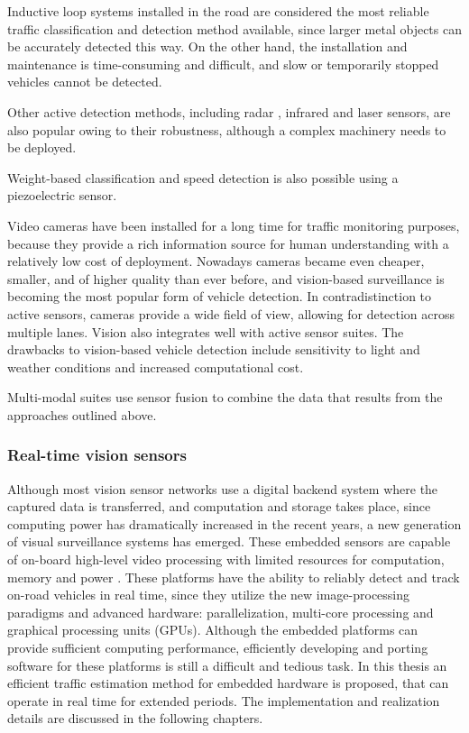 Inductive loop systems installed in the road are considered the most reliable traffic classification and detection method available, since larger metal objects can be accurately detected this way. 
On the other hand, the installation and maintenance is time-consuming and difficult, and slow or temporarily stopped vehicles cannot be detected\cite{Diamond, Zhang2016}.

Other active detection methods, including radar \cite{DeepBlue}, infrared\cite{Swarco, Hussain1995, Ghazal2016} and laser\cite{SICK, Gallego2009} sensors, are also popular owing to their robustness, although a complex machinery needs to be deployed.

Weight-based classification and speed detection is also possible using a piezoelectric sensor\cite{Te, Rivas2017}.

Video cameras have been installed for a long time for traffic monitoring purposes, because they provide a rich information source for human understanding with a relatively low cost of deployment\cite{Tian2011, Buch2011, VideoSurveillance, LaSemaforica}.
Nowadays cameras became even cheaper, smaller, and of higher quality than ever before, and vision-based surveillance is becoming the most popular form of vehicle detection.
In contradistinction to active sensors, cameras provide a wide field of view, allowing for detection across multiple lanes. 
Vision also integrates well with active sensor suites\cite{Garcia2012}.
The drawbacks to vision-based vehicle detection include sensitivity to light and weather conditions and increased computational cost\cite{Sivaraman2013}.

Multi-modal suites use sensor fusion to combine the data that results from the approaches outlined above\cite{Swarco}.

\subsubsection{Real-time vision sensors}
Although most vision sensor networks use a digital backend system where the captured data is transferred, and computation and storage takes place, since computing power has dramatically increased in the recent years, a new generation of visual surveillance systems has emerged.
These embedded sensors are capable of on-board high-level video processing with limited resources for computation, memory and power \cite{Bramberger2004}.
These platforms have the ability to reliably detect and track on-road vehicles in real time, since they utilize the new image-processing paradigms and advanced hardware: parallelization, multi-core processing and graphical processing units (GPUs)\cite{Sivaraman2013}.
Although the embedded platforms can provide sufficient computing performance, efficiently developing and porting software for these platforms is still a difficult and tedious task\cite{Bramberger2004}.
In this thesis an efficient traffic estimation method for embedded hardware is proposed, that can operate in real time for extended periods.
The implementation and realization details are discussed in the following chapters.

